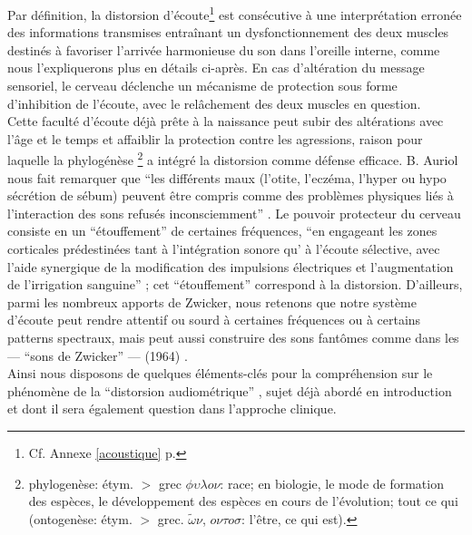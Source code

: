  Par définition, la distorsion d'écoute\footnote {Cf. Annexe \ref{acoustique} p. 
 \pageref{acoustique}} 
 est consécutive à une interprétation
erronée des informations transmises entraînant un dysfonctionnement
des deux muscles destinés à favoriser l'arrivée
harmonieuse du son dans l'oreille interne, comme nous l'expliquerons plus en détails ci-après.
En cas d'altération du message sensoriel,
le cerveau déclenche un mécanisme de protection sous forme
d'inhibition de l'écoute, avec le relâchement des deux muscles en
question. 
 \\
Cette faculté d'écoute déjà prête à la naissance peut subir des
altérations avec l'âge et
le temps et affaiblir la protection contre les agressions, raison pour
laquelle la phylogénèse \footnote{ phylogenèse: étym. $>$ grec $\phi
  \upsilon \lambda o \nu $: race; en biologie, le mode de formation des espèces, le développement
  des espèces en cours de l'évolution; tout ce qui (ontogenèse:
  étym. $>$ grec. $\tilde{\omega}\nu$, $o \nu \tau o
  \sigma$: l'être,
ce qui est).}  a intégré la distorsion comme défense
efficace.
B. Auriol nous fait
remarquer que
\enquote {les différents maux (l'otite, l'eczéma, l'hyper
ou hypo sécrétion de sébum) peuvent être compris comme des problèmes physiques liés à l'interaction des sons refusés
inconsciemment} \autocite [19--20]  {auriol:cle}.
Le pouvoir protecteur du cerveau consiste en un  ``étouffement'' de
certaines fréquences, \enquote {en engageant les zones corticales prédestinées
tant à
l'intégration sonore qu' à l'écoute sélective,  avec l'aide synergique de la
modification des impulsions électriques et l'augmentation de
l'irrigation sanguine} \autocite [14] {auriol:cle};
cet ``étouffement'' correspond à la distorsion.
D'ailleurs,  parmi les nombreux apports de Zwicker, nous retenons que 
notre 
système d'écoute peut rendre
attentif ou sourd à certaines fréquences ou à certains patterns
spectraux, mais peut aussi construire des sons fantômes comme dans les --- ``sons de 
Zwicker'' --- (1964) \autocite[p 84] {auriol:cle}.
\\
Ainsi nous disposons de quelques éléments-clés pour la compréhension
sur le phénomène de la ``distorsion audiométrique'' \autocite
{auriol:cle}, sujet déjà abordé en introduction et dont il sera également question dans l'approche
clinique.
\\
